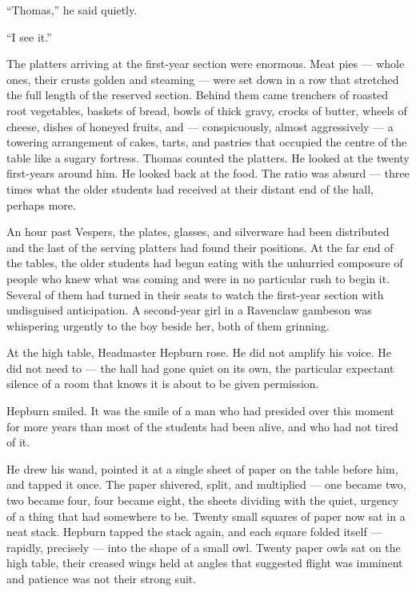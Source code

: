 \enquote{Thomas,} he said quietly.
 
\enquote{I see it.}
 
The platters arriving at the first-year section were enormous. Meat pies --- whole ones, their crusts golden and steaming --- were set down in a row that stretched the full length of the reserved section. Behind them came trenchers of roasted root vegetables, baskets of bread, bowls of thick gravy, crocks of butter, wheels of cheese, dishes of honeyed fruits, and --- conspicuously, almost aggressively --- a towering arrangement of cakes, tarts, and pastries that occupied the centre of the table like a sugary fortress. Thomas counted the platters. He looked at the twenty first-years around him. He looked back at the food. The ratio was absurd --- three times what the older students had received at their distant end of the hall, perhaps more.
 
An hour past Vespers, the plates, glasses, and silverware had been distributed and the last of the serving platters had found their positions. At the far end of the tables, the older students had begun eating with the unhurried composure of people who knew what was coming and were in no particular rush to begin it. Several of them had turned in their seats to watch the first-year section with undisguised anticipation. A second-year girl in a Ravenclaw gambeson was whispering urgently to the boy beside her, both of them grinning.
 
At the high table, Headmaster Hepburn rose. He did not amplify his voice. He did not need to --- the hall had gone quiet on its own, the particular expectant silence of a room that knows it is about to be given permission.
 
Hepburn smiled. It was the smile of a man who had presided over this moment for more years than most of the students had been alive, and who had not tired of it.
 
He drew his wand, pointed it at a single sheet of paper on the table before him, and tapped it once. The paper shivered, split, and multiplied --- one became two, two became four, four became eight, the sheets dividing with the quiet, urgency of a thing that had somewhere to be. Twenty small squares of paper now sat in a neat stack. Hepburn tapped the stack again, and each square folded itself --- rapidly, precisely --- into the shape of a small owl. Twenty paper owls sat on the high table, their creased wings held at angles that suggested flight was imminent and patience was not their strong suit.
 
